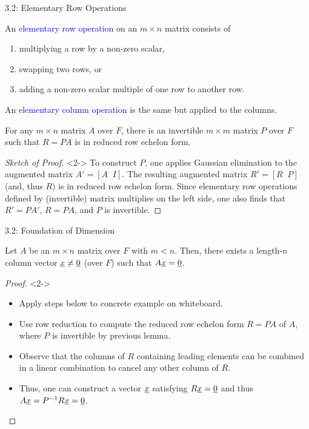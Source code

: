 \documentclass[10pt,letterpaper,english]{beamer}
\begin{document}
\begin{frame}{3.2: Elementary Row Operations}

\begin{definition}
An \textcolor{blue}{elementary row operation} on an $m \times n$ matrix consists of
\begin{enumerate}
\item multiplying a row by a non-zero scalar,
\item swapping two rows, or
\item adding a non-zero scalar multiple of one row to another row.
\end{enumerate}
An \textcolor{blue}{elementary column operation} is the same but applied to the columns.
\end{definition}

\begin{lemma}
For any $m\times n$ matrix $A$ over $F$, there is an invertible $m \times m$ matrix $P$ over $F$ such that $R=PA$ is in reduced row echelon form.
\end{lemma}
\begin{proof}[Sketch of Proof]<2->
To construct $P$, one applies Gaussian elimination to the augmented matrix $A' = [A \;\; I]$.
The resulting augmented matrix $R' = [R \;\; P]$ (and, thus $R$) is in reduced row echelon form.
Since elementary row operations defined by (invertible) matrix multiplies on the left side, one also finds that $R' = P A'$, $R = PA$, and $P$ is invertible.
\end{proof}

\end{frame}

\begin{frame}{3.2: Foundation of Dimension}

\begin{lemma}
Let $A$ be an $m \times n$ matrix over $F$ with $m<n$.
Then, there exists a length-$n$ column vector $\underline{x} \neq \underline{0}$ (over $F$) such that $A \underline{x} = \underline{0}$.
\end{lemma}

\begin{proof}<2->
\begin{itemize}
\item<2-> Apply steps below to concrete example on whiteboard.

\item<3-> Use row reduction to compute the reduced row echelon form $R=PA$ of $A$, where $P$ is invertible by previous lemma.

\item<4-> Observe that the columns of $R$ containing leading elements can be combined in a linear combination to cancel any other column of $R$.

\item<5-> Thus, one can construct a vector $\underline{x}$ satisfying $R\underline{x}=\underline{0}$ and thus $A \underline{x} = P^{-1} R \underline{x} = \underline{0}$. \hfill \qedhere
\end{itemize}
\end{proof}

\end{frame}
\end{document}
